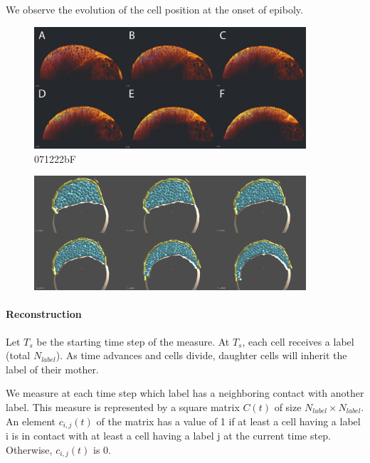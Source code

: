   We observe the evolution of the cell position at the onset of epiboly. 
\begin{figure}
\begin{center}
\includegraphics[width=0.9\textwidth]{../../images/Cases_Studies/Case_4_intercalation/071222bF_horizontal.png}
\end{center}
\caption{071222bF}
\label{Case_4_intercalation_071222bF_horizontal}
\end{figure}
\begin{figure}
\begin{center}
\includegraphics[width=0.9\textwidth]{../../images/Cases_Studies/Case_4_intercalation/simulation/general/simulation_general.png}
\end{center}
\caption{}
\label{simulation_general}
\end{figure}

\paragraph{Reconstruction}

  Let $T_s$ be the starting time step of the measure. At $T_s$, each cell receives a label (total $N_{label}$). As time advances and cells divide, daughter cells will inherit the label of their mother.  

  We measure at each time step which label has a neighboring contact with another label. This measure is represented by a square matrix $C(t)$ of size $N_{label} \times N_{label} $. An element $c_{i,j}(t)$ of the matrix has a value of 1 if at least a cell having a label i is in contact with at least a cell having a label j at the current time step. Otherwise, $c_{i,j}(t)$ is 0. 

